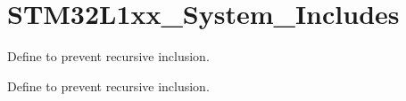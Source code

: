 \hypertarget{group___s_t_m32_l1xx___system___includes}{\section{S\-T\-M32\-L1xx\-\_\-\-System\-\_\-\-Includes}
\label{group___s_t_m32_l1xx___system___includes}
}


Define to prevent recursive inclusion.  


Define to prevent recursive inclusion. 